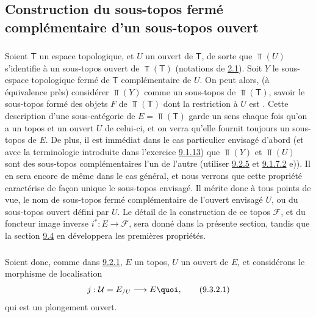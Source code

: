 \subsection{Construction du sous-topos fermé complémentaire d'un
sous-topos ouvert}\pageoriginale

\subsubsection{}
Soient $\mathsf{T}$ un espace topologique, et $U$ un ouvert de
$\mathsf{T}$, de sorte que $\Top(U)$ s'identifie à un sous-topos
ouvert de $\Top(\mathsf{T})$ (notations de \hyperref[IV.subsec2.1]{2.1}). Soit
$Y$ le sous-espace topologique fermé de $\mathsf{T}$ complémentaire
de $U$. On peut alors, (à équivalence près) considérer $\Top(Y)$
comme un sous-topos de $\Top(\mathsf{T})$, savoir le sous-topos
formé des objets $F$ de $\Top(\mathsf{T})$ dont la restriction à $U$
est . Cette description d'une sous-catégorie de
$E=\Top(\mathsf{T})$ garde un sens chaque fois qu'on a un topos et
un ouvert $U$ de celui-ci, et on verra qu'elle fournit toujours un
sous-topos de $E$. De plus, il est immédiat dans le cas particulier
envisagé d'abord (et avec la terminologie introduite dans l'exercice
\hyperref[IV.exer9.1.13]{9.1.13}) que $\Top(Y)$ et $\Top(U)$ sont des sous-topos
complémentaires l'un de l'autre (utiliser \hyperref[IV.subsubsec9.2.5]{9.2.5} et
\hyperref[IV.exer9.1.7.2]{9.1.7.2} e)). Il en sera encore de même dans le cas
général, et nous verrons que cette propriété caractérise de façon
unique le sous-topos envisagé. Il mérite donc à tous points de vue,
le nom de sous-topos fermé complémentaire de l'ouvert envisagé $U$,
ou du sous-topos ouvert défini par $U$. Le détail de la construction
de ce topos $\mathcal{F}$, et du foncteur image inverse
$i^{\ast}:E\rightarrow \mathcal{F}$, sera donné dans la présente
section, tandis que la section \hyperref[IV.subsec9.4]{9.4} en développera les
premières propriétés.

\subsubsection{}
Soient donc, comme dans \hyperref[IV.subsubsec9.2.1]{9.2.1}, $E$ un topos, $U$ un
ouvert de $E$, et considérons le morphisme de localisation
\begin{equation*}
j:\mathcal{U}=E_{/U}\longrightarrow E{\quoi},\tag{9.3.2.1}
\end{equation*}
qui est un plongement ouvert.


